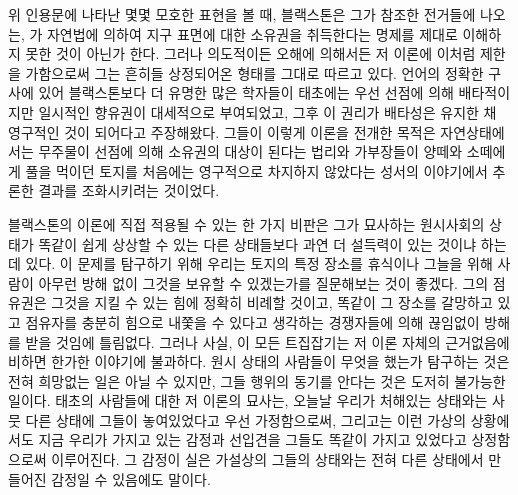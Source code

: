 위 인용문에 나타난 몇몇 모호한 표현을 볼 때,
블랙스톤은
그가 참조한 전거들에 나오는,
가 자연법에 의하여 지구 표면에 대한 소유권을 취득한다는
명제를 제대로 이해하지 못한 것이 아닌가 한다.
그러나
의도적이든 오해에 의해서든
저 이론에 이처럼 제한을 가함으로써
그는
흔히들 상정되어온 형태를 그대로 따르고 있다.
언어의 정확한 구사에 있어
블랙스톤보다 더
유명한 많은 학자들이
태초에는
우선
선점에 의해
배타적이지만 일시적인 향유권이 대세적으로
부여되었고,
그후 이 권리가 배타성은 유지한 채 영구적인 것이 되어다고
주장해왔다.
그들이 이렇게 이론을 전개한 목적은
자연상태에서는
무주물이
선점에 의해
소유권의 대상이 된다는 법리와
가부장들이
양떼와 소떼에게 풀을 먹이던 토지를
처음에는
영구적으로 차지하지 않았다는
성서의 이야기에서
추론한 결과를
조화시키려는 것이었다.

블랙스톤의 이론에 직접 적용될 수 있는 한 가지 비판은
그가 묘사하는 원시사회의 상태가
똑같이 쉽게 상상할 수 있는 다른 상태들보다 과연 더 설득력이 있는 것이냐
하는 데 있다.
이 문제를 탐구하기 위해
우리는
토지의 특정 장소를 휴식이나 그늘을 위해
사람이 아무런 방해 없이 그것을 보유할 수 있겠는가를
질문해보는 것이 좋겠다.
그의 점유권은 그것을 지킬 수 있는 힘에 정확히 비례할 것이고,
똑같이 그 장소를 갈망하고 있고
점유자를
충분히
힘으로
내쫓을 수 있다고 생각하는
경쟁자들에 의해 끊임없이 방해를 받을 것임에 틀림없다.
그러나 사실,
이 모든 트집잡기는 저 이론 자체의 근거없음에 비하면 한가한 이야기에 불과하다.
원시 상태의 사람들이 무엇을 했는가 탐구하는 것은
전혀 희망없는 일은 아닐 수 있지만,
그들 행위의 동기를 안다는 것은 도저히 불가능한 일이다.
태초의 사람들에 대한 저 이론의 묘사는,
오늘날 우리가 처해있는 상태와는 사뭇 다른 상태에
그들이 놓여있었다고 우선 가정함으로써,
그리고는
이런 가상의 상황에서도
지금 우리가 가지고 있는 감정과 선입견을
그들도
똑같이 가지고 있었다고 상정함으로써 이루어진다.
그 감정이 실은 가설상의 그들의 상태와는 전혀 다른 상태에서
만들어진 감정일 수 있음에도 말이다.

